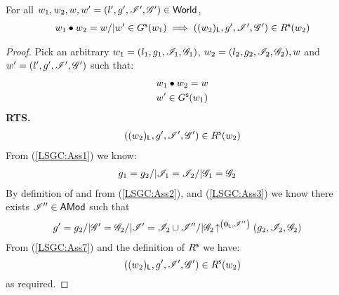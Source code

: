 \begin{lemma}[]\label{lem:shiftGContainment}
%
For all $w_1, w_2, w, w' = (l', g', \mathscr{I}', \mathscr{G}') \in \textsf{World}$, 
\[
\begin{array}{l}
	w_1 \bullet w_2 = w /| w' \in G^{\textsf{s}}(w_1) \implies ((w_2)_{\textsf{L}}, g', \mathscr{I}', \mathscr{G}') \in R^{\textsf{s}}(w_2)
\end{array}
\]
%
\begin{proof} Pick an arbitrary $w_1 = (l_1, g_1, \mathscr{I}_{1}, \mathscr{G}_{1})$, $w_2 = (l_2, g_2, \mathscr{I}_{2}, \mathscr{G}_{2}), w$ and $w' = (l', g', \mathscr{I}', \mathscr{G}')$ such that:
%
\begin{align}
	& w_1 \bullet w_2 = w \label{LSGC:Ass1}\\
	& w' \in G^{\textsf{s}}(w_1) \label{LSGC:Ass2}
\end{align}
%
\textbf{RTS.}
%
\begin{align*}
	((w_2)_{\textsf{L}}, g', \mathscr{I}', \mathscr{G}') \in R^{\textsf{s}}(w_2) 
\end{align*}
%
From (\ref{LSGC:Ass1}) we know:
%
\begin{align}
	& g_1 = g_2 /| \mathscr{I}_{1} = \mathscr{I}_{2} /| \mathscr{G}_{1} = \mathscr{G}_{2} \label{LSGC:Ass3}
\end{align}
%
By definition of \shiftG and from (\ref{LSGC:Ass2}), and (\ref{LSGC:Ass3}) we know there exists $\mathscr{I}'' \in \textsf{AMod}$ such that
%
\begin{align}
%
	& g' = g_2 /| \gmod' = \gmod_2 /| \lmod' = \lmod_{2} \cup \lmod'' /| \expandsAM{\gmod_{2}}{\unitL}{\lmod''}{g_2}{\lmod_{2}}{\gmod_{2}}\label{LSGC:Ass7}
%
\end{align}
%
From (\ref{LSGC:Ass7}) and the definition of $R^{\textsf{s}}$ we have:
%
\begin{equation}
	((w_2)_{\textsf{L}}, g', \mathscr{I}', \mathscr{G}') \in R^{\textsf{s}}(w_2) \nonumber
\end{equation}
% 
as required.
\end{proof}
%
%
\end{lemma}
%
